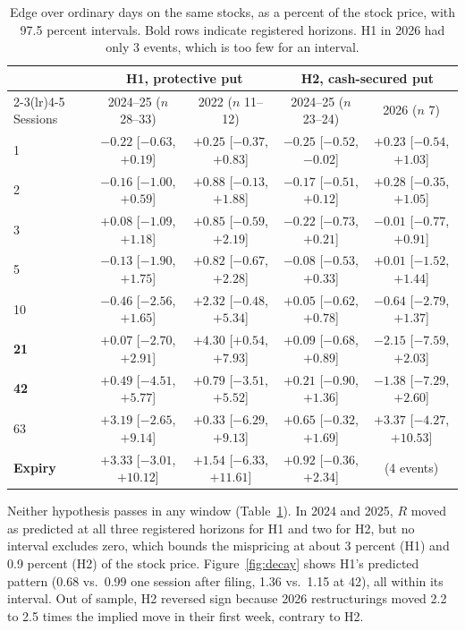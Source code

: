 \documentclass[11pt]{article}
\makeatletter
\renewcommand\section{\@startsection{section}{1}{\z@}{-1.2ex \@plus -.3ex \@minus -.2ex}{0.4ex}{\normalfont\normalsize\bfseries}}
\makeatother
\begin{document}
\section{Results}
\begin{table}[h]
\centering
\caption{Edge over ordinary days on the same stocks, as a percent of the stock price, with 97.5 percent intervals. Bold rows indicate registered horizons. H1 in 2026 had only 3 events, which is too few for an interval.}
\label{tab:edge}
\footnotesize
\setlength{\tabcolsep}{4pt}
\begin{tabular}{lcccc}
\toprule
 & \multicolumn{2}{c}{H1, protective put} & \multicolumn{2}{c}{H2, cash-secured put} \\
\cmidrule(lr){2-3}\cmidrule(lr){4-5}
Sessions & 2024--25 ($n$ 28--33) & 2022 ($n$ 11--12) & 2024--25 ($n$ 23--24) & 2026 ($n$ 7) \\
\midrule
1  & $-0.22$ [$-0.63$, $+0.19$] & $+0.25$ [$-0.37$, $+0.83$] & $-0.25$ [$-0.52$, $-0.02$] & $+0.23$ [$-0.54$, $+1.03$] \\
2  & $-0.16$ [$-1.00$, $+0.59$] & $+0.88$ [$-0.13$, $+1.88$] & $-0.17$ [$-0.51$, $+0.12$] & $+0.28$ [$-0.35$, $+1.05$] \\
3  & $+0.08$ [$-1.09$, $+1.18$] & $+0.85$ [$-0.59$, $+2.19$] & $-0.22$ [$-0.73$, $+0.21$] & $-0.01$ [$-0.77$, $+0.91$] \\
5  & $-0.13$ [$-1.90$, $+1.75$] & $+0.82$ [$-0.67$, $+2.28$] & $-0.08$ [$-0.53$, $+0.33$] & $+0.01$ [$-1.52$, $+1.44$] \\
10 & $-0.46$ [$-2.56$, $+1.65$] & $+2.32$ [$-0.48$, $+5.34$] & $+0.05$ [$-0.62$, $+0.78$] & $-0.64$ [$-2.79$, $+1.37$] \\
\textbf{21} & $+0.07$ [$-2.70$, $+2.91$] & $\mathbf{+4.30}$ [$+0.54$, $+7.93$] & $+0.09$ [$-0.68$, $+0.89$] & $-2.15$ [$-7.59$, $+2.03$] \\
\textbf{42} & $+0.49$ [$-4.51$, $+5.77$] & $+0.79$ [$-3.51$, $+5.52$] & $+0.21$ [$-0.90$, $+1.36$] & $-1.38$ [$-7.29$, $+2.60$] \\
63 & $+3.19$ [$-2.65$, $+9.14$] & $+0.33$ [$-6.29$, $+9.13$] & $+0.65$ [$-0.32$, $+1.69$] & $+3.37$ [$-4.27$, $+10.53$] \\
\textbf{Expiry} & $+3.33$ [$-3.01$, $+10.12$] & $+1.54$ [$-6.33$, $+11.61$] & $+0.92$ [$-0.36$, $+2.34$] & (4 events) \\
\bottomrule
\end{tabular}
\end{table}

Neither hypothesis passes in any window (Table~\ref{tab:edge}). In 2024 and 2025, $R$ moved as predicted at all three registered horizons for H1 and two for H2, but no interval excludes zero, which bounds the mispricing at about 3 percent (H1) and 0.9 percent (H2) of the stock price. Figure~\ref{fig:decay} shows H1's predicted pattern (0.68 vs.\ 0.99 one session after filing, 1.36 vs.\ 1.15 at 42), all within its interval. Out of sample, H2 reversed sign because 2026 restructurings moved 2.2 to 2.5 times the implied move in their first week, contrary to H2.
\end{document}
